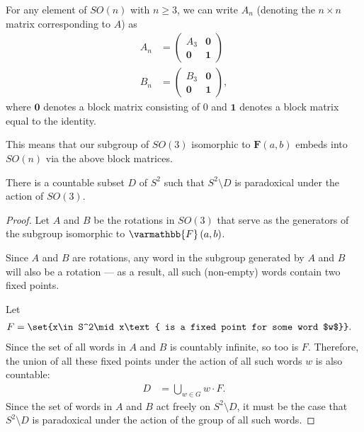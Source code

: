 \documentclass[10pt]{mypackage}
\renewcommand*{\mathbb}[1]{\varmathbb{#1}}
\begin{document}
\begin{remark}
  For any element of $SO(n)$ with $n \geq 3$, we can write $A_n$ (denoting the $n\times n$ matrix corresponding to $A$) as
  \begin{align*}
    A_n &= 
    \begin{pmatrix}
      A_3 & \mathbf{0}\\
      \mathbf{0} & \mathbf{1}
    \end{pmatrix}\\
    B_n &= \begin{pmatrix}B_3 & \mathbf{0}\\ \mathbf{0} & \mathbf{1}\end{pmatrix},
  \end{align*}
  where $\mathbf{0}$ denotes a block matrix consisting of $0$ and $\mathbf{1}$ denotes a block matrix equal to the identity.\newline

  This means that our subgroup of $SO(3)$ isomorphic to $\mathbf{F}\left(a,b\right)$ embeds into $SO(n)$ via the above block matrices.
\end{remark}
\begin{theorem}
  There is a countable subset $D$ of $S^2$ such that $S^2\setminus D$ is paradoxical under the action of $SO(3)$.
\end{theorem}
\begin{proof}
  Let $A$ and $B$ be the rotations in $SO(3)$ that serve as the generators of the subgroup isomorphic to $\mathbb{F}\left(a,b\right)$.\newline

  Since $A$ and $B$ are rotations, any word in the subgroup generated by $A$ and $B$ will also be a rotation --- as a result, all such (non-empty) words contain two fixed points.\newline

  Let
  \begin{align*}
    F &= \set{x\in S^2\mid x\text{ is a fixed point for some word $w$}}.
  \end{align*}
  Since the set of all words in $A$ and $B$ is countably infinite, so too is $F$. Therefore, the union of all these fixed points under the action of all such words $w$ is also countable:
  \begin{align*}
    D &= \bigcup_{w\in G} w\cdot F.
  \end{align*}
  Since the set of words in $A$ and $B$ act freely on $S^2\setminus D$, it must be the case that $S^{2}\setminus D$ is paradoxical under the action of the group of all such words.
\end{proof}
\end{document}
